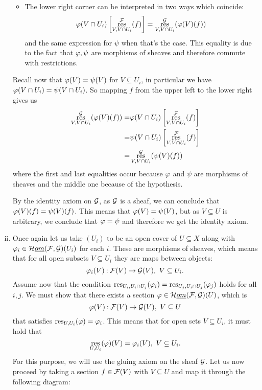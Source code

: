 \documentclass[12pt]{memoir}
\begin{document}
\begin{ptcbr}
\begin{enumerate}[i)]
\begin{itemize}
    \item The lower right corner can be interpreted in two ways which coincide:
    $$\varphi(V\cap U_i)\left\lbrack\operatorname*{res}^{\mathcal{F}}_{V,V\cap U_i}(f)\right\rbrack=\operatorname*{res}^{\mathcal{G}}_{V,V\cap U_i}(\varphi(V)(f))$$
    and the same expression for $\psi$ when that's the case. This equality is due to the fact that $\varphi,\psi$ are morphisms of sheaves and therefore commute with restrictions.
\end{itemize}
Recall now that $\varphi(V)=\psi(V)$ for $V\subseteq U_i$, in particular we have $\varphi(V\cap U_i)=\psi(V\cap U_i)$. So mapping $f$ from the upper left to the lower right gives us
\begin{align*}
\operatorname*{res}^{\mathcal{G}}_{V,V\cap U_i}(\varphi(V)(f))= &\varphi(V\cap U_i)\left\lbrack\operatorname*{res}^{\mathcal{F}}_{V,V\cap U_i}(f)\right\rbrack\\
=&\psi(V\cap U_i)\left\lbrack\operatorname*{res}^{\mathcal{F}}_{V,V\cap U_i}(f)\right\rbrack\\
=&\operatorname*{res}^{\mathcal{G}}_{V,V\cap U_i}(\psi(V)(f))
\end{align*}
where the first and last equalities occur because $\varphi$ and $\psi$ are morphisms of sheaves and the middle one because of the hypothesis.\par 
By the identity axiom on $\mathcal{G}$, as $\mathcal{G}$ is a sheaf, we can conclude that $\varphi(V)(f)=\psi(V)(f)$. This means that $\varphi(V)=\psi(V)$, but as $V\subseteq U$ is arbitrary, we conclude that $\varphi=\psi$ and therefore we get the identity axiom.
\item Once again let us take $(U_i)$ to be an open cover of $U\subseteq X$ along with $\varphi_i\in\mathcal{H}\emph{om}(\mathcal{F},\mathcal{G})(U_i)$ for each $i$. These are morphisms of sheaves, which means that for all open subsets $V\subseteq U_i$  they are maps between objects: 
$$\varphi_i(V)\mathbin{:}\mathcal{F}(V)\to\mathcal{G}(V),\ V\subseteq U_i.$$
Assume now that the condition $\operatorname*{res}_{U_i,U_i\cap U_j}(\varphi_i)=\operatorname*{res}_{U_j,U_i\cap U_j}(\varphi_j)$ holds for all $i,j$. We must show that there exists a section $\varphi\in\mathcal{H}\emph{om}(\mathcal{F},\mathcal{G})(U)$, which is
$$\varphi(V)\mathbin{:}\mathcal{F}(V)\to\mathcal{G}(V),\ V\subseteq U$$
that satisfies $\operatorname*{res}_{U,U_i}(\varphi)=\varphi_i$. This means that for open sets $V\subseteq U_i$, it must hold that 
$$\operatorname*{res}_{U,U_i}(\varphi)(V)=\varphi_i(V),\ V\subseteq U_i.$$
For this purpose, we will use the gluing axiom on the sheaf $\mathcal{G}$. Let us now proceed by taking a section $f\in\mathcal{F}(V)$ with $V\subseteq U$ and map it through the following diagram:
\begin{center}

\end{center}
\end{enumerate}
\end{ptcbr}
\end{document}
